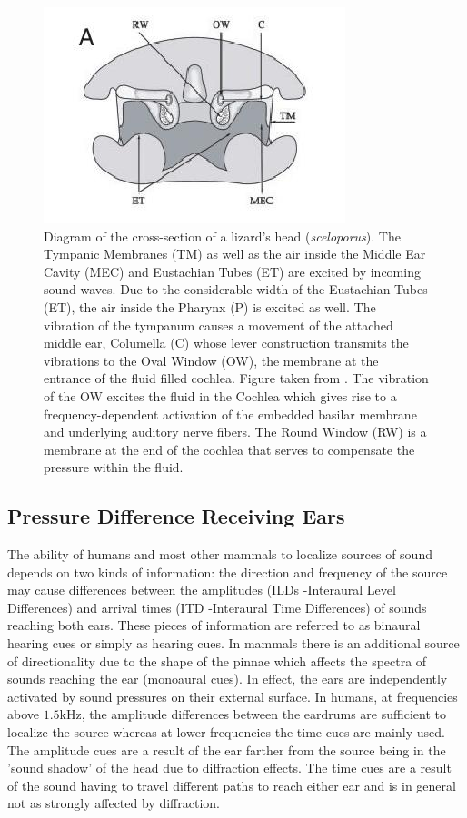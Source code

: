 \begin{figure}[ht]
 \centering
 \includegraphics[width=0.45\linewidth]{Diagrams/lizardheadcrosssection.jpeg}
 \caption[Cross Section of a Lizards Head]{Diagram of the cross-section of a lizard’s head (\emph{sceloporus}). The Tympanic Membranes (TM) as well as
 the air inside the Middle Ear Cavity (MEC) and Eustachian Tubes (ET) are excited by incoming sound waves. Due to the considerable width of the Eustachian Tubes (ET), the air inside the Pharynx (P) is excited as well.
 The vibration of the tympanum causes a movement of the attached middle ear, Columella (C) whose lever construction transmits the vibrations to the Oval Window (OW), the membrane at the entrance of the fluid filled cochlea.
 Figure taken from \cite{dalsgaardmanley1}. The vibration of the OW excites the fluid in the Cochlea which gives rise to a frequency-dependent activation of the embedded basilar membrane and underlying
 auditory nerve fibers. The Round Window (RW) is a membrane at the end of the cochlea that serves to compensate the pressure within the fluid.}
 \label{lizardheadcrosssection}
\end{figure}

\subsection{Pressure Difference Receiving Ears}\label{iceintrosection}
The ability of humans and most other mammals to localize sources of sound depends on two kinds of information: the direction and frequency
of the source may cause differences between the amplitudes (ILDs -Interaural Level Differences) and arrival times (ITD -Interaural Time Differences) of sounds reaching both ears. These pieces of information are
referred to as binaural hearing cues or simply as hearing cues. In mammals there is an additional source of directionality due to the shape
of the pinnae which affects the spectra of sounds reaching the ear (monoaural cues). In effect, the ears are independently activated by sound pressures
on their external surface. In humans, at frequencies above $1.5$kHz, the amplitude differences between the eardrums are sufficient
to localize the source whereas at lower frequencies the time cues are mainly used. The amplitude cues are a result of the ear farther
from the source being in the 'sound shadow' of the head due to diffraction effects. The time cues are a result of the sound having to travel
different paths to reach either ear and is in general not as strongly affected by diffraction.

